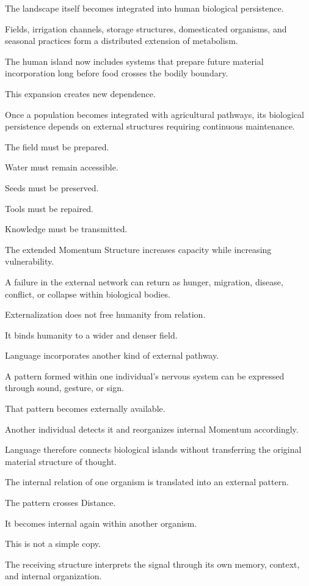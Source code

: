 The landscape itself becomes integrated into human biological persistence.

Fields, irrigation channels, storage structures, domesticated organisms, and seasonal practices form a distributed extension of metabolism.

The human island now includes systems that prepare future material incorporation long before food crosses the bodily boundary.

This expansion creates new dependence.

Once a population becomes integrated with agricultural pathways, its biological persistence depends on external structures requiring continuous maintenance.

The field must be prepared.

Water must remain accessible.

Seeds must be preserved.

Tools must be repaired.

Knowledge must be transmitted.

The extended Momentum Structure increases capacity while increasing vulnerability.

A failure in the external network can return as hunger, migration, disease, conflict, or collapse within biological bodies.

Externalization does not free humanity from relation.

It binds humanity to a wider and denser field.

Language incorporates another kind of external pathway.

A pattern formed within one individual’s nervous system can be expressed through sound, gesture, or sign.

That pattern becomes externally available.

Another individual detects it and reorganizes internal Momentum accordingly.

Language therefore connects biological islands without transferring the original material structure of thought.

The internal relation of one organism is translated into an external pattern.

The pattern crosses Distance.

It becomes internal again within another organism.

This is not a simple copy.

The receiving structure interprets the signal through its own memory, context, and internal organization.

